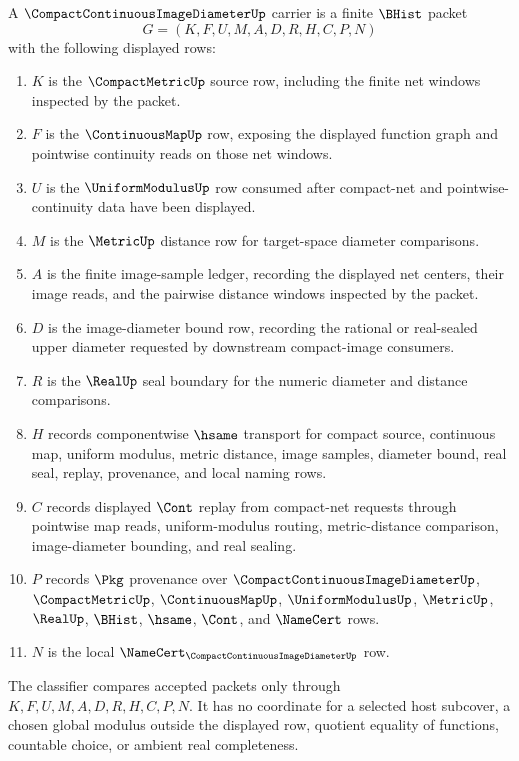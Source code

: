 \begin{definition}
\label{def:compact-continuous-image-diameter-carrier}
A $\CompactContinuousImageDiameterUp$ carrier is a finite $\BHist$ packet
$$
G=(K,F,U,M,A,D,R,H,C,P,N)
$$
with the following displayed rows:
\begin{enumerate}
\item $K$ is the $\CompactMetricUp$ source row, including the finite net windows inspected by the packet.
\item $F$ is the $\ContinuousMapUp$ row, exposing the displayed function graph and pointwise continuity reads on those net windows.
\item $U$ is the $\UniformModulusUp$ row consumed after compact-net and pointwise-continuity data have been displayed.
\item $M$ is the $\MetricUp$ distance row for target-space diameter comparisons.
\item $A$ is the finite image-sample ledger, recording the displayed net centers, their image reads, and the pairwise distance windows inspected by the packet.
\item $D$ is the image-diameter bound row, recording the rational or real-sealed upper diameter requested by downstream compact-image consumers.
\item $R$ is the $\RealUp$ seal boundary for the numeric diameter and distance comparisons.
\item $H$ records componentwise $\hsame$ transport for compact source, continuous map, uniform modulus, metric distance, image samples, diameter bound, real seal, replay, provenance, and local naming rows.
\item $C$ records displayed $\Cont$ replay from compact-net requests through pointwise map reads, uniform-modulus routing, metric-distance comparison, image-diameter bounding, and real sealing.
\item $P$ records $\Pkg$ provenance over $\CompactContinuousImageDiameterUp$, $\CompactMetricUp$, $\ContinuousMapUp$, $\UniformModulusUp$, $\MetricUp$, $\RealUp$, $\BHist$, $\hsame$, $\Cont$, and $\NameCert$ rows.
\item $N$ is the local $\NameCert_{\CompactContinuousImageDiameterUp}$ row.
\end{enumerate}
The classifier compares accepted packets only through $K,F,U,M,A,D,R,H,C,P,N$. It has no coordinate for a selected host subcover, a chosen global modulus outside the displayed row, quotient equality of functions, countable choice, or ambient real completeness.
\end{definition}

